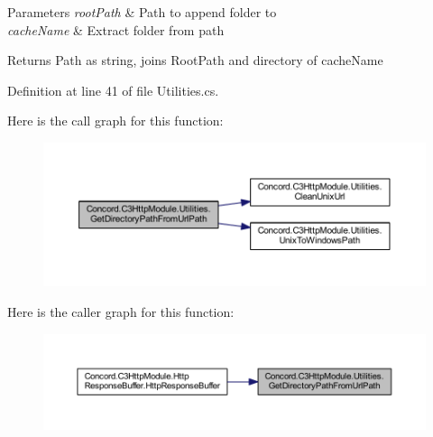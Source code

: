 \begin{DoxyParams}{Parameters}
{\em root\+Path} & Path to append folder to\\
\hline
{\em cache\+Name} & Extract folder from path\\
\hline
\end{DoxyParams}
\begin{DoxyReturn}{Returns}
Path as string, joins Root\+Path and directory of cache\+Name
\end{DoxyReturn}


Definition at line 41 of file Utilities.\+cs.

Here is the call graph for this function\+:
\nopagebreak
\begin{figure}[H]
\begin{center}
\leavevmode
\includegraphics[width=350pt]{class_concord_1_1_c3_http_module_1_1_utilities_a38d22d17b3554cf5064b7b4a9e5dbef0_cgraph}
\end{center}
\end{figure}
Here is the caller graph for this function\+:
\nopagebreak
\begin{figure}[H]
\begin{center}
\leavevmode
\includegraphics[width=350pt]{class_concord_1_1_c3_http_module_1_1_utilities_a38d22d17b3554cf5064b7b4a9e5dbef0_icgraph}
\end{center}
\end{figure}
\mbox{\label{class_concord_1_1_c3_http_module_1_1_utilities_a34a3dbc84a7e367188bb8cf6a81343c8}} 
